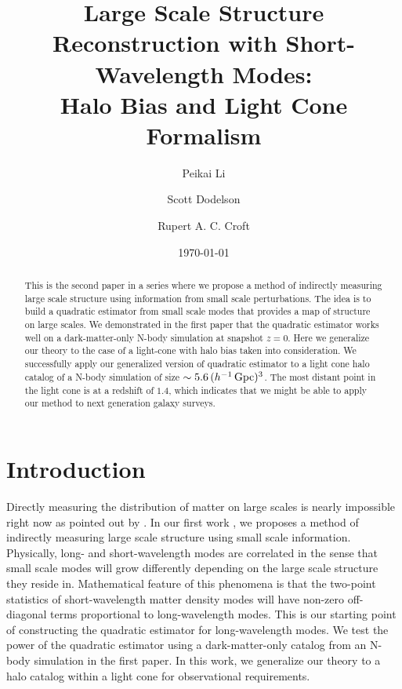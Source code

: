 \documentclass[prd,amsmath,amssymb,floatfix,superscriptaddress,nofootinbib,twocolumn]{revtex4-1}
\begin{document}
\title{Large Scale Structure Reconstruction with Short-Wavelength Modes: \\Halo Bias and Light Cone Formalism}
\author{\large Peikai Li}
\author{\large Scott Dodelson}
\author{\large Rupert A. C. Croft}

\date{\today}
\begin{abstract}
\noindent This is the second paper in a series where we propose a method of indirectly measuring large scale structure using information from small scale perturbations. The idea is to build a quadratic estimator from small scale modes that provides a map of structure on large scales.
We demonstrated in the first paper that the quadratic estimator works well on a dark-matter-only N-body simulation at snapshot $z=0$. Here we generalize our theory to the case of a light-cone with halo bias taken into consideration. We successfully apply our generalized version of quadratic estimator to a light cone halo catalog of a N-body simulation of size $\sim5.6\,(h^{-1}\,\rm Gpc)^3$. The most distant point in the light cone is at a redshift of $1.4$, which indicates that we might be able to apply our method to next generation galaxy surveys.
\end{abstract}
\maketitle
\section{Introduction} \label{sec1}
\noindent Directly measuring the distribution of matter on large scales is nearly impossible right now as pointed out by \cite{Modi:2019hydr}. In our first work \cite{Li:2020fir}, we proposes a method of indirectly measuring large scale structure using small scale information. Physically, long- and short-wavelength modes are correlated in the sense that small scale modes will grow differently depending on the large scale structure they reside in. Mathematical feature of this phenomena is that the two-point statistics of short-wavelength matter density modes will have non-zero off-diagonal terms proportional to long-wavelength modes. This is our starting point of constructing the quadratic estimator for long-wavelength modes. We test the power of the quadratic estimator using a dark-matter-only catalog from an N-body simulation in the first paper. In this work, we generalize our theory to a halo catalog within a light cone for observational requirements.
\end{document}
